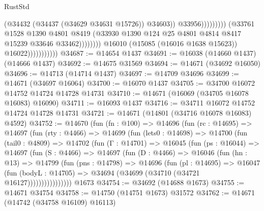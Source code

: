 \begin{lexlean}{RustStd}
\begin{coremodule}
                                                          (@34432
                                                            (@34437 (@34629 @34631 @15726))
                                                            @34603))
                                                        @33956)))))))))
                                      (@33761
                                        @1528
                                        @1390
                                        @4801
                                        @8419
                                        (@33930
                                          @1390
                                          @124
                                          @25
                                          @4801
                                          @4814
                                          @8417
                                          @15239
                                          @33646
                                          @33462))))))))
                          @16010
                          (@15085 (@16016 @1638 @15623))
                          @16022)))))))))))
@34687 := @14654 @1437
@34691 := @16038 (@14660 @1437) (@14666 @1437)
@34692 := @14675 @31569
@34694 := @14671 (@34692 @16050)
@34696 := @14713 (@14714 @1437)
@34697 := @14709 @34696
@34699 := @14671 (@34697 @16064)
@34700 := @16070 @1437
@34705 := @34700 @16072 @14752 @14724 @14728 @14731
@34710 := @14671 (@16069 (@34705 @16078 @16083) @16090)
@34711 := @16093 @1437
@34716 := @34711 @16072 @14752 @14724 @14728 @14731
@34721 := @14671 (@14801 (@34716 @16078 @16083) @4592)
@34752 := @14670
    (fun (fn : @100) =>
    @14696
      (fun (rc : @14695) =>
      @14697
        (fun (rty : @4466) =>
        @14699
          (fun (lets0 : @14698) =>
          @14700
            (fun (tail0 : @4809) =>
            @14702
              (fun (Γ : @14701) =>
              @16045
                (fun (ps : @16044) =>
                @14697
                  (fun (S : @4466) =>
                  @14697
                    (fun (D : @4466) =>
                    @16046
                      (fun (hn : @13) =>
                      @14799
                        (fun (pns : @14798) =>
                        @14696
                          (fun (pl : @14695) =>
                          @16047
                            (fun (bodyL : @14705) =>
                            @34694 (@34699 (@34710 (@34721 @16127))))))))))))))))
    @1673
@34754 := @34692 (@14688 @1673)
@34755 := @14671 @34754
@34758 := @14750 (@14751 @1673) @31572
@34762 := @14671 (@14742 (@34758 @16109) @16113)

\end{coremodule}
\end{lexlean}
